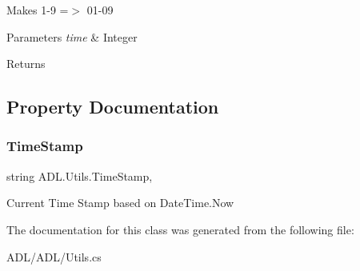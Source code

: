 Makes 1-\/9 =$>$ 01-\/09 


\begin{DoxyParams}{Parameters}
{\em time} & Integer\\
\hline
\end{DoxyParams}
\begin{DoxyReturn}{Returns}

\end{DoxyReturn}


\subsection{Property Documentation}
\mbox{\label{class_a_d_l_1_1_utils_a93a1013d16031cf968a4383b56f4b24f}} 
\subsubsection{\texorpdfstring{Time\+Stamp}{TimeStamp}}
{\footnotesize\ttfamily string A\+D\+L.\+Utils.\+Time\+Stamp\hspace{0.3cm}{\ttfamily [static]}, {\ttfamily [get]}}



Current Time Stamp based on Date\+Time.\+Now 



The documentation for this class was generated from the following file\+:\begin{DoxyCompactItemize}
\item 
A\+D\+L/\+A\+D\+L/Utils.\+cs\end{DoxyCompactItemize}
